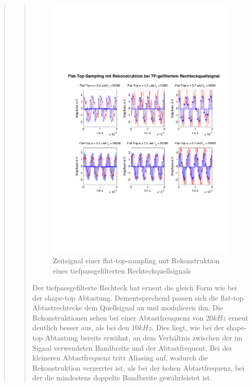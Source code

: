 \begin{quote}
\begin{quote}
      	    \begin{figure}[H]
            \centering
            \includegraphics[scale=0.6, trim = 1.5cm 6cm 1cm 8cm,
            clip]{./Bilder/flat-top-tp-recht}
                \caption{Zeitsignal einer flat-top-sampling mit Rekonstruktion
                eines tiefpassgefilterten Rechteckquellsignals}
      	    \end{figure}
      	    
      	    Der tiefpassgefilterte Rechteck hat erneut die gleich Form wie bei
      	    der shape-top Abtastung. Dementsprechend passen sich die flat-top 
      	    Abtastrechtecke dem Quellsignal an und modulieren ihn. Die
      	    Rekonstruktionen sehen bei einer Abtastfreuquenz von $20 kHz$
      	    erneut deutlich besser aus, als bei den $10 kHz$. Dies liegt, wie
      	    bei der shape-top Abtastung bereits erwähnt, an dem Verhältnis
      	    zwischen der im Signal verwendeten Bandbreite und der
      	    Abtastfrequent. Bei der kleineren Abtastfrequenz tritt
      	    Aliasing auf, wodurch die Rekonstruktion verzerrter ist, als bei der
      	    hohen Abtastfrequenz, bei der die mindestens doppelte Bandbreite
      	    gewährleistet ist.\\
      	    

\end{quote}
\end{quote}
